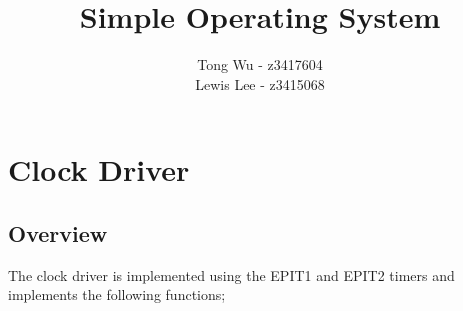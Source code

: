 \documentclass[12pt]{article}
\begin{document}
\pagestyle{myheadings}

\title{Simple Operating System}
\author{Tong Wu - z3417604\\Lewis Lee - z3415068}

\maketitle

\clearpage

\tableofcontents

\clearpage

\section{Clock Driver}
\subsection{Overview}
The clock driver is implemented using the EPIT1 and EPIT2 timers and implements the following functions;
\end{document}
